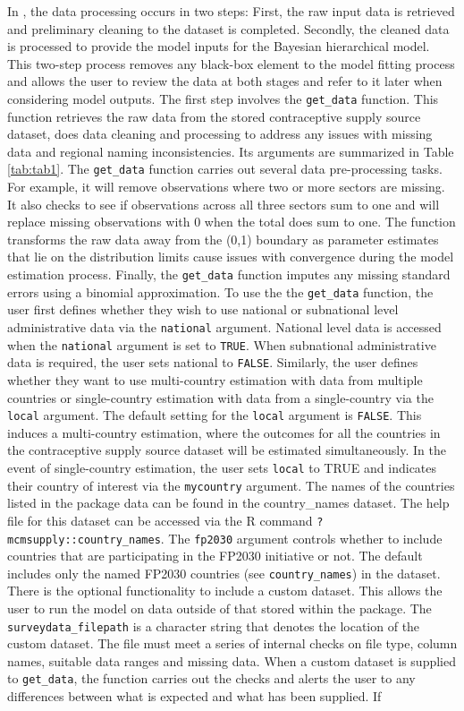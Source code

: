 In , the data processing occurs in two steps: First, the raw input data is retrieved and preliminary cleaning to the dataset is completed. Secondly, the cleaned data is processed to provide the model inputs for the Bayesian hierarchical model. This two-step process removes any black-box element to the model fitting process and allows the user to review the data at both stages and refer to it later when considering model outputs.
The first step involves the \texttt{get\_data} function. This function retrieves the raw data from the stored contraceptive supply source dataset, does data cleaning and processing to address any issues with missing data and regional naming inconsistencies. Its arguments are summarized in Table \ref{tab:tab1}. The \texttt{get\_data} function carries out several data pre-processing tasks. For example, it will remove observations where two or more sectors are missing. It also checks to see if observations across all three sectors sum to one and will replace missing observations with 0 when the total does sum to one. The function transforms the raw data away from the (0,1) boundary as parameter estimates that lie on the distribution limits cause issues with convergence during the model estimation process. Finally, the \texttt{get\_data} function imputes any missing standard errors using a binomial approximation. To use the the \texttt{get\_data} function, the user first defines whether they wish to use national or subnational level administrative data via the \texttt{national} argument. National level data is accessed when the \texttt{national} argument is set to \texttt{TRUE}. When subnational administrative data is required, the user sets national to \texttt{FALSE}. Similarly, the user defines whether they want to use multi-country estimation with data from multiple countries or single-country estimation with data from a single-country via the \texttt{local} argument. The default setting for the \texttt{local} argument is \texttt{FALSE}. This induces a multi-country estimation, where the outcomes for all the countries in the contraceptive supply source dataset will be estimated simultaneously. In the event of single-country estimation, the user sets \texttt{local} to TRUE and indicates their country of interest via the \texttt{mycountry} argument. The names of the countries listed in the package data can be found in the country\_names dataset. The help file for this dataset can be accessed via the R command \texttt{?mcmsupply::country\_names}. The \texttt{fp2030} argument controls whether to include countries that are participating in the FP2030 initiative or not. The default includes only the named FP2030 countries (see \texttt{country\_names}) in the dataset. There is the optional functionality to include a custom dataset. This allows the user to run the model on data outside of that stored within the package. The \texttt{surveydata\_filepath} is a character string that denotes the location of the custom dataset. The file must meet a series of internal checks on file type, column names, suitable data ranges and missing data. When a custom dataset is supplied to \texttt{get\_data}, the function carries out the checks and alerts the user to any differences between what is expected and what has been supplied. If 